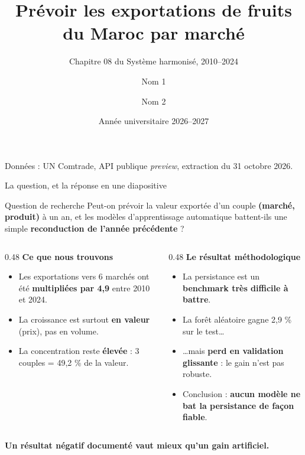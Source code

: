\documentclass[aspectratio=169,10pt]{beamer}
\title[Exportations agroalimentaires marocaines]{Prévoir les exportations de fruits du Maroc par marché}
\subtitle{Chapitre 08 du Système harmonisé, 2010--2024}
\author[Nom 1 \& Nom 2]{Nom 1 \and Nom 2}
\institute[Établissement]{Établissement \\ Data Science appliquée au commerce international}
\date{Année universitaire 2026--2027}
\begin{document}
\begin{frame}[plain]
  \titlepage
  \vspace{-0.6em}
  \begin{center}
    {\scriptsize\color{gris}Données : UN Comtrade, API publique \emph{preview}, extraction du 31 octobre 2026.}
  \end{center}
\end{frame}

\begin{frame}{La question, et la réponse en une diapositive}
  \begin{block}{Question de recherche}
    Peut-on prévoir la valeur exportée d'un couple \textbf{(marché, produit)}
    à un an, et les modèles d'apprentissage automatique battent-ils une simple
    \textbf{reconduction de l'année précédente} ?
  \end{block}

  \vspace{0.3em}
  \begin{columns}[T,onlytextwidth]
    \begin{column}{0.48\textwidth}
      \textbf{Ce que nous trouvons}
      \begin{itemize}
        \item Les exportations vers 6 marchés ont été \textbf{multipliées par 4,9}
              entre 2010 et 2024.
        \item La croissance est surtout \textbf{en valeur} (prix), pas en volume.
        \item La concentration reste \textbf{élevée} : 3 couples = 49,2 \% de la valeur.
      \end{itemize}
    \end{column}
    \begin{column}{0.48\textwidth}
      \textbf{Le résultat méthodologique}
      \begin{itemize}
        \item La persistance est un \textbf{benchmark très difficile à battre}.
        \item La forêt aléatoire gagne 2,9 \% sur le test\ldots
        \item \ldots mais \textbf{perd en validation glissante} : le gain n'est
              pas robuste.
        \item Conclusion : \textbf{aucun modèle ne bat la persistance de
              façon fiable}.
      \end{itemize}
    \end{column}
  \end{columns}

  \vfill
  \begin{center}
    \small\color{vertfonce}\textbf{Un résultat négatif documenté vaut mieux qu'un gain artificiel.}
  \end{center}
\end{frame}
\end{document}

